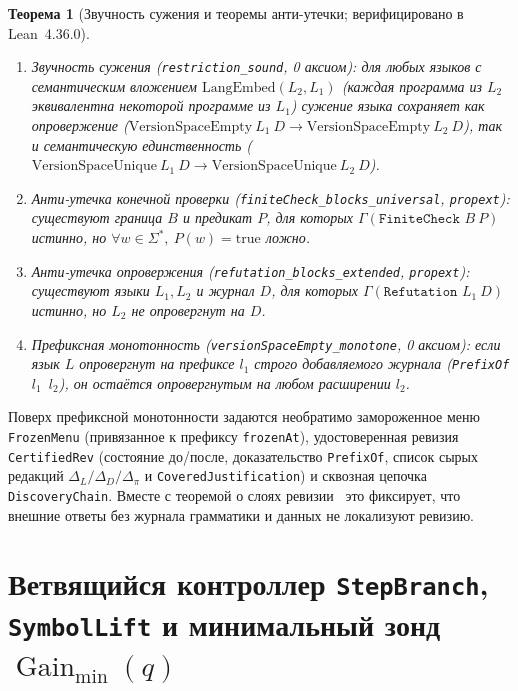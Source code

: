 \documentclass[11pt,a4paper]{article}
\theoremstyle{preprintthm}
\newtheorem{theorem}{Теорема}[section]
\theoremstyle{preprintdef}
\newcommand{\Gain}{\operatorname{Gain}}
\begin{document}
\begin{theorem}[Звучность сужения и теоремы анти-утечки; верифицировано в Lean~4.36.0]
\label{thm:judgement}
\begin{enumerate}
  \item \emph{Звучность сужения (\texttt{restriction\_\allowbreak sound}, 0 аксиом):} для любых языков с семантическим вложением $\mathrm{LangEmbed}(L_2, L_1)$ (каждая программа из $L_2$ эквивалентна некоторой программе из $L_1$) сужение языка сохраняет как опровержение ($\mathrm{VersionSpaceEmpty}\ L_1\ D\to\mathrm{VersionSpaceEmpty}\ L_2\ D$), так и семантическую единственность ($\mathrm{VersionSpaceUnique}\ L_1\ D\to\mathrm{VersionSpaceUnique}\ L_2\ D$).
  \item \emph{Анти-утечка конечной проверки (\texttt{finiteCheck\_\allowbreak blocks\_\allowbreak universal}, \texttt{propext}):} существуют граница $B$ и предикат $P$, для которых $\Gamma(\texttt{FiniteCheck } B\ P)$ истинно, но $\forall w\in\Sigma^*,\ P(w)=\mathrm{true}$ ложно.
  \item \emph{Анти-утечка опровержения (\texttt{refutation\_\allowbreak blocks\_\allowbreak extended}, \texttt{propext}):} существуют языки $L_1, L_2$ и журнал $D$, для которых $\Gamma(\texttt{Refutation } L_1\ D)$ истинно, но $L_2$ не опровергнут на $D$.
  \item \emph{Префиксная монотонность (\texttt{versionSpaceEmpty\_\allowbreak monotone}, 0 аксиом):} если язык $L$ опровергнут на префиксе $l_1$ строго добавляемого журнала (\texttt{PrefixOf $l_1$ $l_2$}), он остаётся опровергнутым на любом расширении $l_2$.
\end{enumerate}
\end{theorem}

Поверх префиксной монотонности задаются необратимо замороженное меню \texttt{FrozenMenu} (привязанное к префиксу \texttt{frozenAt}), удостоверенная ревизия \texttt{CertifiedRev} (состояние до/после, доказательство \texttt{PrefixOf}, список сырых редакций $\Delta_L/\Delta_D/\Delta_\pi$ и \texttt{CoveredJustification}) и сквозная цепочка \texttt{DiscoveryChain}. Вместе с теоремой о слоях ревизии~\cite[Теорема~3]{strand2026ms2} это фиксирует, что внешние ответы без журнала грамматики и данных не локализуют ревизию.

\section{Ветвящийся контроллер \texorpdfstring{\texttt{StepBranch}}{StepBranch}, \texorpdfstring{\texttt{SymbolLift}}{SymbolLift} и минимальный зонд \texorpdfstring{$\Gain_{\min}(q)$}{Gain\_min(q)}}
\end{document}

